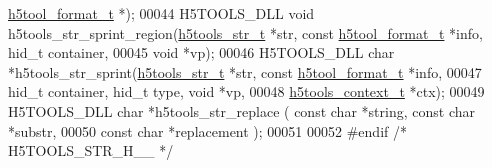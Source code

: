 \begin{DoxyCode}
      \hyperlink{structh5tool__format__t}{h5tool\_format\_t} *);
00044 H5TOOLS\_DLL \textcolor{keywordtype}{void}     h5tools\_str\_sprint\_region(\hyperlink{structh5tools__str__t}{h5tools\_str\_t} *str, \textcolor{keyword}{const} 
      \hyperlink{structh5tool__format__t}{h5tool\_format\_t} *info, hid\_t container,
00045                                    \textcolor{keywordtype}{void} *vp);
00046 H5TOOLS\_DLL \textcolor{keywordtype}{char}    *h5tools\_str\_sprint(\hyperlink{structh5tools__str__t}{h5tools\_str\_t} *str, \textcolor{keyword}{const} 
      \hyperlink{structh5tool__format__t}{h5tool\_format\_t} *info,
00047                                    hid\_t container, hid\_t type, \textcolor{keywordtype}{void} *vp,
00048                                    \hyperlink{structh5tools__context__t}{h5tools\_context\_t} *ctx);
00049 H5TOOLS\_DLL \textcolor{keywordtype}{char}    *h5tools\_str\_replace ( \textcolor{keyword}{const} \textcolor{keywordtype}{char} *\textcolor{keywordtype}{string}, \textcolor{keyword}{const} \textcolor{keywordtype}{char} *substr, 
00050                                     \textcolor{keyword}{const} \textcolor{keywordtype}{char} *replacement );
00051 
00052 \textcolor{preprocessor}{#endif  }\textcolor{comment}{/* H5TOOLS\_STR\_H\_\_ */}\textcolor{preprocessor}{}
\end{DoxyCode}
